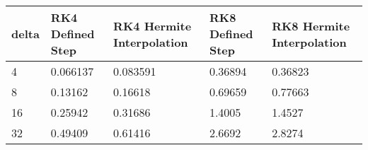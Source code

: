 \begin{tabular}{lllll}
delta & RK4 Defined Step & RK4 Hermite Interpolation & RK8 Defined Step & RK8 Hermite Interpolation \\ 
\hline 
4 & 0.066137 & 0.083591 & 0.36894 & 0.36823 \\ 
8 & 0.13162 & 0.16618 & 0.69659 & 0.77663 \\ 
16 & 0.25942 & 0.31686 & 1.4005 & 1.4527 \\ 
32 & 0.49409 & 0.61416 & 2.6692 & 2.8274 \\ 
\hline 
\end{tabular}